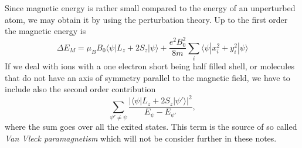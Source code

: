 Since magnetic energy is rather small compared to the energy of an unperturbed atom, we may obtain it by using the perturbation theory. Up to the first order the magnetic energy is
\begin{equation}\label{eq:E_magnetic}
\Delta E_M = \mu_B B_0 \langle \psi | L_z + 2 S_z | \psi \rangle 
+ \frac{e^2 B_0^2}{8 m}\sum_i \langle \psi | x_i^2 + y_i^2 | \psi \rangle
\end{equation} 
If we deal with ions with a one electron short being half filled shell, or molecules that do not have an axis of symmetry parallel to the magnetic field, we have to include also the second order contribution
\begin{equation}
\sum_{\psi' \neq \psi} \frac{|\langle \psi | L_z + 2 S_z | \psi' \rangle|^2}{E_\psi - E_{\psi'}},
\end{equation}
where the sum goes over all the exited states. This term is the source of so called \emph{Van Vleck paramagnetism} which will not be consider further in these notes.

